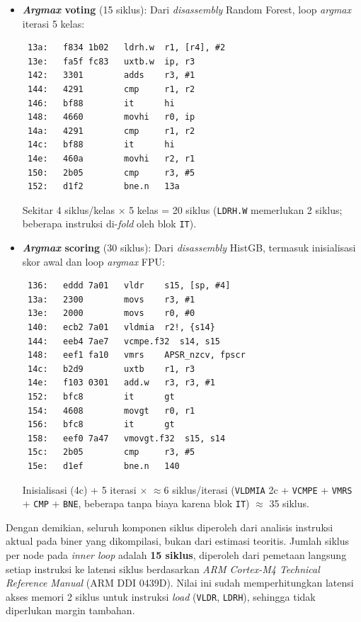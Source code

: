 \begin{enumerate}
\begin{itemize}
        \item \textbf{\textit{Argmax} voting} (15 siklus): Dari \textit{disassembly} Random Forest, loop \textit{argmax} iterasi 5 kelas:
\begin{verbatim}
 13a:   f834 1b02   ldrh.w  r1, [r4], #2
 13e:   fa5f fc83   uxtb.w  ip, r3
 142:   3301        adds    r3, #1
 144:   4291        cmp     r1, r2
 146:   bf88        it      hi
 148:   4660        movhi   r0, ip
 14a:   4291        cmp     r1, r2
 14c:   bf88        it      hi
 14e:   460a        movhi   r2, r1
 150:   2b05        cmp     r3, #5
 152:   d1f2        bne.n   13a
\end{verbatim}
        Sekitar 4 siklus/kelas $\times$ 5 kelas = 20 siklus (\texttt{LDRH.W} memerlukan 2 siklus; beberapa instruksi di-\textit{fold} oleh blok \texttt{IT}).

        \item \textbf{\textit{Argmax} scoring} (30 siklus): Dari \textit{disassembly} HistGB, termasuk inisialisasi skor awal dan loop \textit{argmax} FPU:
\begin{verbatim}
 136:   eddd 7a01   vldr    s15, [sp, #4]
 13a:   2300        movs    r3, #1
 13e:   2000        movs    r0, #0
 140:   ecb2 7a01   vldmia  r2!, {s14}
 144:   eeb4 7ae7   vcmpe.f32  s14, s15
 148:   eef1 fa10   vmrs    APSR_nzcv, fpscr
 14c:   b2d9        uxtb    r1, r3
 14e:   f103 0301   add.w   r3, r3, #1
 152:   bfc8        it      gt
 154:   4608        movgt   r0, r1
 156:   bfc8        it      gt
 158:   eef0 7a47   vmovgt.f32  s15, s14
 15c:   2b05        cmp     r3, #5
 15e:   d1ef        bne.n   140
\end{verbatim}
        Inisialisasi (4c) + 5 iterasi $\times$ $\approx$6 siklus/iterasi (\texttt{VLDMIA} 2c + \texttt{VCMPE} + \texttt{VMRS} + \texttt{CMP} + \texttt{BNE}, beberapa tanpa biaya karena blok \texttt{IT}) $\approx$ 35 siklus.
    \end{itemize}
\end{enumerate}

Dengan demikian, seluruh komponen siklus diperoleh dari analisis instruksi aktual pada biner yang dikompilasi, bukan dari estimasi teoritis. Jumlah siklus per node pada \textit{inner loop} adalah \textbf{15 siklus}, diperoleh dari pemetaan langsung setiap instruksi ke latensi siklus berdasarkan \textit{ARM Cortex-M4 Technical Reference Manual} (ARM DDI 0439D). Nilai ini sudah memperhitungkan latensi akses memori 2 siklus untuk instruksi \textit{load} (\texttt{VLDR}, \texttt{LDRH}), sehingga tidak diperlukan margin tambahan.

